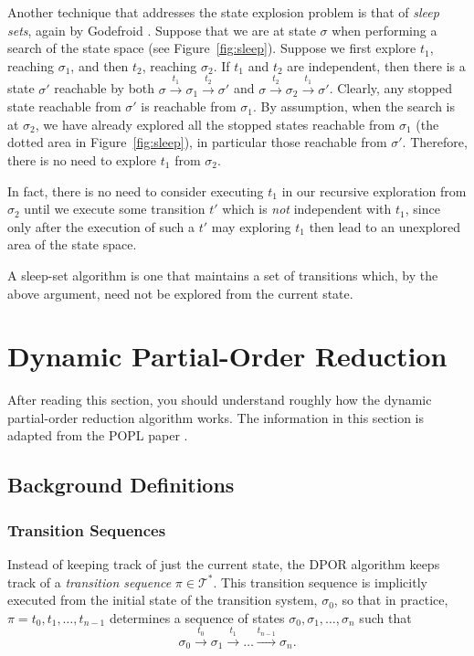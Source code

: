 \documentclass[12pt,a4paper,twoside,openany]{report}
\begin{document}
Another technique that addresses
the state explosion problem is
that of \emph{sleep sets}, again by Godefroid \cite{god91}.
Suppose that
we are at state $\sigma$ when performing a search
of the state space (see Figure~\ref{fig:sleep}).
Suppose we first explore $t_1$, reaching $\sigma_1$,
and then $t_2$, reaching $\sigma_2$.
If $t_1$ and $t_2$ are independent, then there
is a state $\sigma'$ reachable by both
$\sigma \xrightarrow{t_1} \sigma_1
\xrightarrow{t_2} \sigma'$ and
$\sigma \xrightarrow{t_2} \sigma_2
\xrightarrow{t_1} \sigma'$.
Clearly, any stopped state reachable from $\sigma'$
is reachable from $\sigma_1$. By assumption,
when the search is at $\sigma_2$, we have already
explored all the stopped states reachable from
$\sigma_1$ (the dotted area in Figure~\ref{fig:sleep}),
in particular those reachable from
$\sigma'$. Therefore, there is no need to
explore $t_1$ from $\sigma_2$.

In fact, there is no need to consider executing
$t_1$ in our recursive exploration from $\sigma_2$
until we execute some transition $t'$ which is
\emph{not} independent with $t_1$, since only after
the execution of such a $t'$ may exploring $t_1$
then lead to an unexplored area of the state space.

A sleep-set algorithm is one that maintains a
set of transitions which, by the above argument,
need not be explored from the current state.

\section{Dynamic Partial-Order Reduction}
\label{sec:dpor-prep}
After reading this section, you should
understand roughly how the dynamic
partial-order reduction algorithm works.
The information in this section is
adapted from the POPL paper \cite{flan05}.

\subsection{Background Definitions}

\subsubsection{Transition Sequences}
Instead of keeping track of just the current state,
the DPOR algorithm
keeps track of a \emph{transition
sequence} $\pi \in \mathcal{T}^*$. This transition
sequence is implicitly executed from the initial state of
the transition system, $\sigma_0$, so that in practice,
$\pi = t_0, t_1, \ldots, t_{n-1}$ determines a sequence of states
$\sigma_0, \sigma_1, \ldots, \sigma_n$ such that
\[
	\sigma_0 \xrightarrow{\ t_0\ } \sigma_1 \xrightarrow{\ t_1\ }
	\ldots \xrightarrow{t_{n-1}} \sigma_n.
\]
\end{document}
